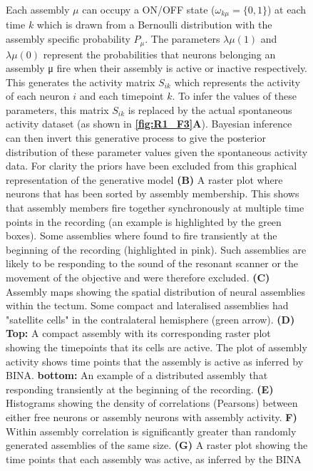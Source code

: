             \begin{figure}[!ht]
            \captionsetup{labelformat=adja-page}
            \ContinuedFloat
            \caption[]{Each assembly $\mu$ can occupy a ON/OFF state ($\omega_{k\mu} = \{0,1\}$) at each time $k$ which is drawn from a Bernoulli distribution with the assembly specific probability $P_{\mu}$. The parameters $\lambda\mu(1)$ and $\lambda\mu(0)$ represent the probabilities that neurons belonging an assembly μ fire when their assembly is active or inactive respectively. This generates the activity matrix $S_{ik}$ which represents the activity of each neuron $i$ and each timepoint $k$. To infer the values of these parameters, this matrix $S_{ik}$ is replaced by the actual spontaneous activity dataset (as shown in  \textbf{\ref{fig:R1_F3}A}).  Bayesian inference can then invert this generative process to give the posterior distribution of these parameter values given the spontaneous activity data. For clarity the priors have been excluded from this graphical representation of the generative model \textbf{(B)} A raster plot where neurons that has been sorted by assembly membership. This shows that assembly members fire together synchronously at multiple time points in the recording (an example is highlighted by the green boxes). Some assemblies where found to fire transiently at the beginning of the recording (highlighted in pink). Such assemblies are likely to be responding to the sound of the resonant scanner or the movement of the objective and were therefore excluded. \textbf{(C)} Assembly maps showing the spatial distribution of neural assemblies within the tectum. Some compact and lateralised assemblies had "satellite cells" in the contralateral hemisphere (green arrow). \textbf{(D) Top:} A compact assembly with its corresponding raster plot showing the timepoints that its cells are active. The plot of assembly activity shows time points that the assembly is active as inferred by BINA. \textbf{bottom:} An example of a distributed assembly that responding transiently at the beginning of the  recording. \textbf{(E)} Histograms showing the density of correlations (Pearsons) between either free neurons or assembly neurons with assembly activity. \textbf{F)} Within assembly correlation is significantly greater than randomly generated assemblies of the same size. \textbf{(G)} A raster plot showing the time points that each assembly was active, as inferred by the BINA \label{fig:R1_F4}}
    \end{figure}  
      
\clearpage
